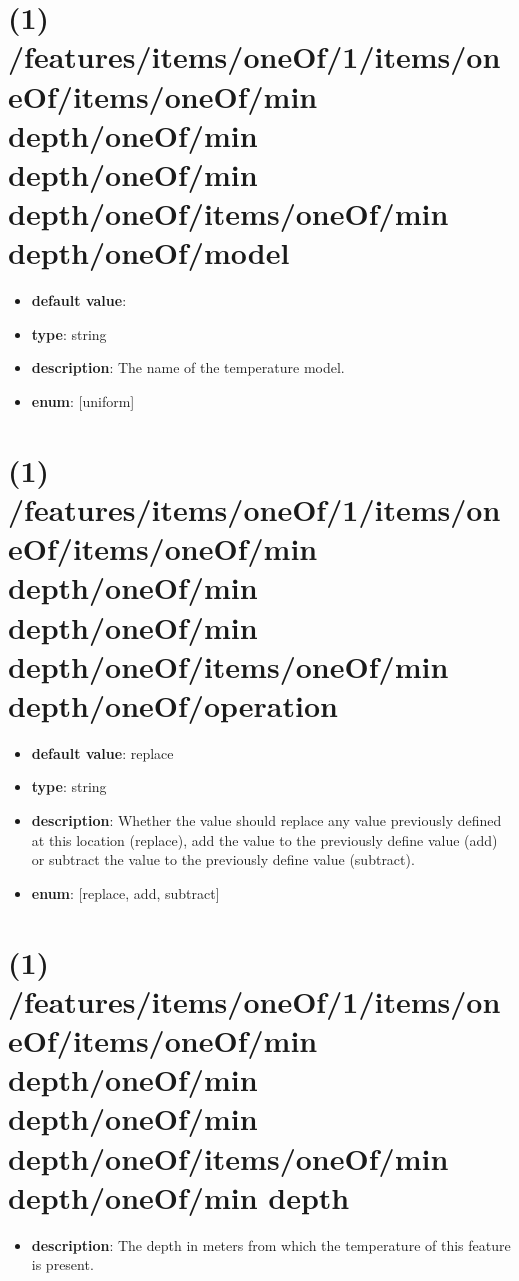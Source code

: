 \section{(1) /features/items/oneOf/1/items/oneOf/items/oneOf/min depth/oneOf/min depth/oneOf/min depth/oneOf/items/oneOf/min depth/oneOf/model}
\begin{itemize}[leftmargin=1em]\item {\bf default value}: 
\item {\bf type}: string
\item {\bf description}: The name of the temperature model.
\item {\bf enum}: [uniform]\end{itemize}\section{(1) /features/items/oneOf/1/items/oneOf/items/oneOf/min depth/oneOf/min depth/oneOf/min depth/oneOf/items/oneOf/min depth/oneOf/operation}
\begin{itemize}[leftmargin=1em]\item {\bf default value}: replace
\item {\bf type}: string
\item {\bf description}: Whether the value should replace any value previously defined at this location (replace), add the value to the previously define value (add) or subtract the value to the previously define value (subtract).
\item {\bf enum}: [replace, add, subtract]\end{itemize}\section{(1) /features/items/oneOf/1/items/oneOf/items/oneOf/min depth/oneOf/min depth/oneOf/min depth/oneOf/items/oneOf/min depth/oneOf/min depth}
\begin{itemize}[leftmargin=1em]\item {\bf description}: The depth in meters from which the temperature of this feature is present.
\end{itemize}
